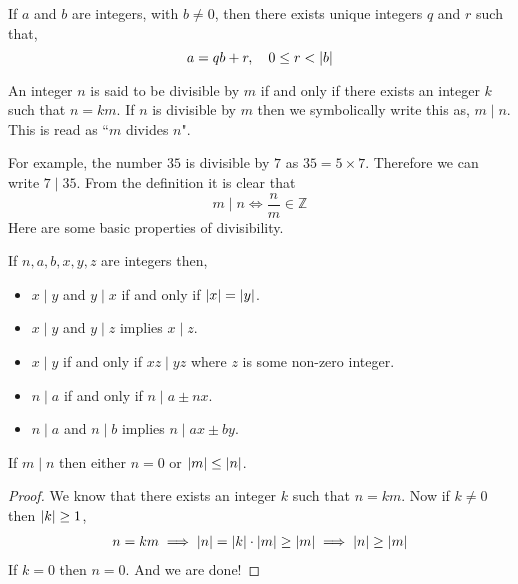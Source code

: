\begin{corollary}
    If $a$ and $b$ are integers, with $b\neq 0$, then there exists unique integers $q$ and $r$ such that,
    \[
        a = qb + r, \quad 0\leq r < \left\lvert b \right\rvert
    \]
\end{corollary}

\begin{definition}
    An integer $n$ is said to be divisible by $m$ if and only if 
    there exists an integer $k$ such that $n = km$. If $n$ is 
    divisible by $m$ then we symbolically write this as, $m \mid n$. 
    This is read as ``$m$ divides $n$".
\end{definition}
For example, the number $35$ is divisible by $7$ as $35 = 5 \times 7$. 
Therefore we can write $7 \mid 35$. From the definition it is clear that 
\[
    m \mid n \iff \frac{n}{m} \in \mathbb{Z}
\]
Here are some basic properties of divisibility.
\begin{theorem}
    If $n, a, b, x, y, z$ are integers then,
    \begin{itemize}
        \item $ x \mid y$ and $y \mid x$ if and only if $\left\lvert x \right\rvert = \left\lvert y \right\rvert$.
        \item $x \mid y$ and $y \mid z$ implies $x \mid z$.
        \item $x \mid y$ if and only if $xz \mid yz$ where $z$ is some non-zero integer.
        \item $n \mid a$ if and only if $n \mid a \pm nx$.
        \item $ n\mid a$ and $n\mid b$ implies $n\mid ax \pm by$.
    \end{itemize}
\end{theorem}

\begin{theorem}
    If $m \mid n$ then either $n=0$ or $\left\lvert m \right\rvert \leq \left\lvert n \right\rvert$.
\end{theorem}
\begin{proof}
    We know that there exists an integer $k$ such that $n = km$. Now if $k\neq 0$ then $\left\lvert k \right\rvert \geq 1$,
    \begin{align*}
        n = km 
        \implies \left\lvert n \right\rvert = \left\lvert k \right\rvert\cdot\left\lvert m \right\rvert \geq \left\lvert m \right\rvert 
        \implies \left\lvert n \right\rvert \geq \left\lvert m \right\rvert
    \end{align*}
    If $k=0$ then $n=0$. And we are done!
\end{proof}

